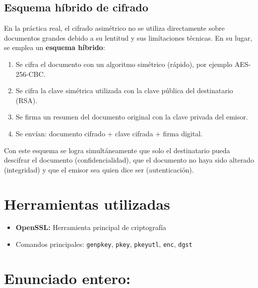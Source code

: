 \subsection{Esquema híbrido de cifrado}

En la práctica real, el cifrado asimétrico no se utiliza directamente sobre documentos 
grandes debido a su lentitud y sus limítaciones técnicas. En su lugar, se emplea un
 \textbf{esquema híbrido}:

\begin{enumerate}
    \item Se cifra el documento con un algoritmo simétrico (rápido), por ejemplo AES-256-CBC.
    \item Se cifra la clave simétrica utilizada con la clave pública del destinatario (RSA).
    \item Se firma un resumen del documento original con la clave privada del emisor.
    \item Se envían: documento cifrado + clave cifrada + firma digital.
\end{enumerate}

Con este esquema se logra simultáneamente que solo el destinatario pueda descifrar el 
documento (confidencialidad), que el documento no haya sido alterado 
(integridad) y que el emisor sea quien dice ser (autenticación).

\section{Herramientas utilizadas}

\begin{itemize}[label=\textbullet]
    \item \textbf{OpenSSL:} Herramienta principal de criptografía
    \item Comandos principales: \texttt{genpkey}, \texttt{pkey}, \texttt{pkeyutl}, \texttt{enc}, \texttt{dgst}
\end{itemize}

\section{Enunciado entero:}
